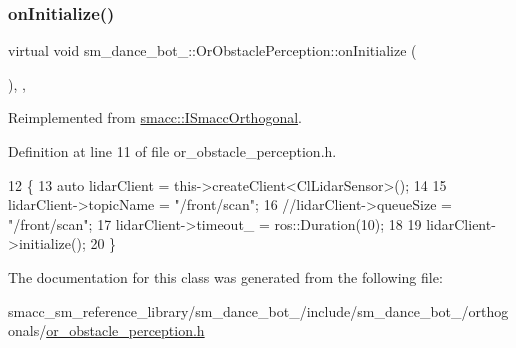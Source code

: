 \subsubsection{\texorpdfstring{on\+Initialize()}{onInitialize()}}
{\footnotesize\ttfamily virtual void sm\+\_\+dance\+\_\+bot\+\_\+::\+Or\+Obstacle\+Perception\+::on\+Initialize (\begin{DoxyParamCaption}{ }\end{DoxyParamCaption})\hspace{0.3cm}{\ttfamily [inline]}, {\ttfamily [override]}, {\ttfamily [virtual]}}



Reimplemented from \hyperlink{classsmacc_1_1ISmaccOrthogonal_a6bb31c620cb64dd7b8417f8705c79c7a}{smacc\+::\+I\+Smacc\+Orthogonal}.



Definition at line 11 of file or\+\_\+obstacle\+\_\+perception.\+h.


\begin{DoxyCode}
12     \{
13         \textcolor{keyword}{auto} lidarClient = this->createClient<ClLidarSensor>();
14 
15         lidarClient->topicName = \textcolor{stringliteral}{"/front/scan"};
16         \textcolor{comment}{//lidarClient->queueSize = "/front/scan";}
17         lidarClient->timeout\_ = ros::Duration(10);
18 
19         lidarClient->initialize();
20     \}
\end{DoxyCode}


The documentation for this class was generated from the following file\+:\begin{DoxyCompactItemize}
\item 
smacc\+\_\+sm\+\_\+reference\+\_\+library/sm\+\_\+dance\+\_\+bot\+\_/include/sm\+\_\+dance\+\_\+bot\+\_/orthogonals/\hyperlink{sm__dance__bot__2_2include_2sm__dance__bot__2_2orthogonals_2or__obstacle__perception_8h}{or\+\_\+obstacle\+\_\+perception.\+h}\end{DoxyCompactItemize}
